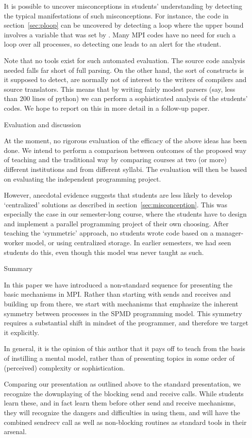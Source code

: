 It is possible to uncover misconceptions in students' understanding by
detecting the typical manifestations of such misconceptions. For
instance, the code in section~\ref{sec:ploop} can be uncovered by
detecting a loop where the upper bound involves a variable that was
set by . Many MPI codes have no need for such a loop
over all processes, so detecting one leads to an alert for the
student.

Note that no tools exist for such automated evaluation. The source
code analysis needed falls far short of full parsing. On the other
hand, the sort of constructs is it supposed to detect, are normally
not of interest to the writers of compilers and source
translators. This means that by writing fairly modest parsers (say,
less than 200 lines of python) we can perform a sophisticated analysis
of the students' codes. We hope to report on this in more detail in a
follow-up paper.

 {Evaluation and discussion}
\label{sec:eval}

At the moment,
no rigorous evaluation of the efficacy of the above ideas has been
done.
We intend to perform a
comparison between outcomes of the proposed way of teaching and the
traditional way by comparing courses at two (or more) different
institutions and from different syllabi. The evaluation will
then be based on evaluating the independent programming project.

However, anecdotal evidence suggests that students are less likely to
develop `centralized' solutions as described in
section~\ref{sec:misconception}. This was especially the case in our
semester-long course, where the students have to design and implement a parallel
programming project of their own choosing. After teaching the
`symmetric' approach, no students wrote code based on a manager-worker
model, or using centralized storage. In earlier semesters, we had seen
students do this, even though this model was never taught as such.

 {Summary}
\label{sec:summary}

In this paper we have introduced a non-standard sequence for presenting
the basic mechanisms in MPI. Rather than starting with sends and receives and building
up from there, we start with mechanisms that emphasize the inherent symmetry between
processes in the \ac{SPMD} programming model. This symmetry requires a substantial
shift in mindset of the programmer, and therefore we target it explicitly.

In general, it is the opinion of this author that it pays off to teach
from the basis of instilling a mental model, rather than of presenting
topics in some order of (perceived) complexity or sophistication.

Comparing our presentation as outlined above to the standard presentation, we
recognize the downplaying of the blocking send and receive calls. While students
learn these, and in fact learn them before other send and receive mechanisms,
they will recognize the dangers and difficulties in using them, and
will have the combined sendrecv call as well as non-blocking routines
as standard tools in their arsenal.

